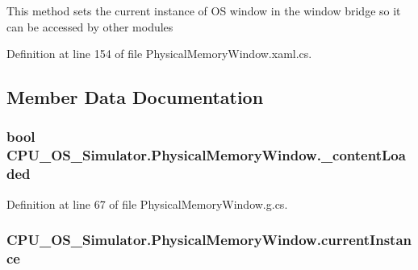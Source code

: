 This method sets the current instance of O\+S window in the window bridge so it can be accessed by other modules 



Definition at line 154 of file Physical\+Memory\+Window.\+xaml.\+cs.



\subsection{Member Data Documentation}
\hypertarget{class_c_p_u___o_s___simulator_1_1_physical_memory_window_af0d68d9589d9aa671b580a5b9c3f4851}{}
\subsubsection[{\+\_\+content\+Loaded}]{\setlength{\rightskip}{0pt plus 5cm}bool C\+P\+U\+\_\+\+O\+S\+\_\+\+Simulator.\+Physical\+Memory\+Window.\+\_\+content\+Loaded\hspace{0.3cm}{\ttfamily [private]}}\label{class_c_p_u___o_s___simulator_1_1_physical_memory_window_af0d68d9589d9aa671b580a5b9c3f4851}


Definition at line 67 of file Physical\+Memory\+Window.\+g.\+cs.

\hypertarget{class_c_p_u___o_s___simulator_1_1_physical_memory_window_a5baebf9b07c700f57ea5e6c6ec96e7c5}{}
\subsubsection[{current\+Instance}]{ C\+P\+U\+\_\+\+O\+S\+\_\+\+Simulator.\+Physical\+Memory\+Window.\+current\+Instance\hspace{0.3cm}{\ttfamily [static]}}\label{class_c_p_u___o_s___simulator_1_1_physical_memory_window_a5baebf9b07c700f57ea5e6c6ec96e7c5}


